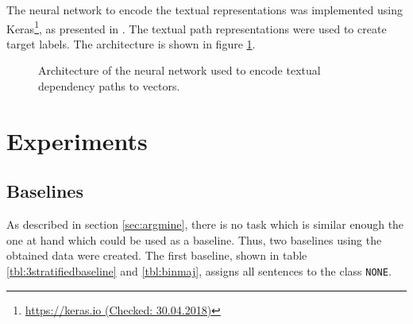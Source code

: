 The neural network to encode the textual representations was implemented using Keras\footnote{\url{https://keras.io (Checked: 30.04.2018)}}, as presented in \cite{chollet2015keras}. The textual path representations were used to create target labels. The architecture is shown in figure \ref{fig:lexnetnn}.

\begin{figure}[h]
\centering
\caption{Architecture of the neural network used to encode textual dependency paths to vectors.}
\label{fig:lexnetnn}
\end{figure}





\section{Experiments}
\subsection{Baselines}
\label{sec:3_baseline}
As described in section \ref{sec:argmine}, there is no task which is similar enough the one at hand which could be used as a baseline. Thus, two baselines using the obtained data were created. The first baseline, shown in table \ref{tbl:3stratifiedbaseline} and \ref{tbl:binmaj}, assigns all sentences to the class \texttt{NONE}.


